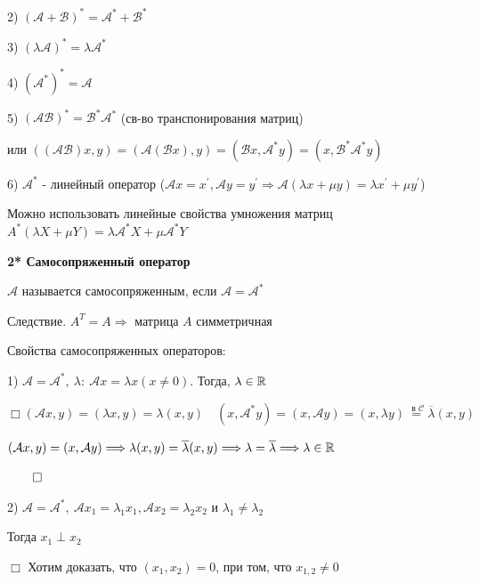 \documentclass[12pt]{article}
\begin{document}
    2) $\displaystyle (\mathcal{A} + \mathcal{B})^* = \mathcal{A}^* + \mathcal{B}^*$

    3) $\displaystyle (\lambda \mathcal{A})^* = \lambda \mathcal{A}^*$

    4) $\displaystyle (\mathcal{A}^*)^* = \mathcal{A}$

    5) $\displaystyle (\mathcal{A}\mathcal{B})^* = \mathcal{B}^* \mathcal{A}^*$ (св-во транспонирования матриц)

    или $\displaystyle ((\mathcal{AB})x, y) = (\mathcal{A}(\mathcal{B}x), y) = (\mathcal{B}x, \mathcal{A}^* y) = (x, \mathcal{B}^* \mathcal{A}^* y)$

    6) $\displaystyle \mathcal{A}^*$ - линейный оператор ($\displaystyle \mathcal{A}x = x^\prime, \mathcal{A}y = y^\prime \Longrightarrow \mathcal{A}(\lambda x + \mu y) = \lambda x^\prime + \mu y^\prime$)

    Можно использовать линейные свойства умножения матриц $\displaystyle A^* (\lambda X + \mu Y) = \lambda \mathcal{A}^* X + \mu \mathcal{A}^* Y$

    \textbf{2* Самосопряженный оператор}

    \Def $\mathcal{A}$ называется самосопряженным, если $\displaystyle \mathcal{A} = \mathcal{A}^*$

    Следствие. $\displaystyle A^T = A \Longrightarrow$ матрица $A$ симметричная

    Свойства самосопряженных операторов:

    1) $\displaystyle \mathcal{A} = \mathcal{A}^*, \ \lambda : \ \mathcal{A}x = \lambda x (x \neq 0)$. Тогда, $\lambda \in \mathbb{R}$

    $\displaystyle \Box (\mathcal{A}x, y) = (\lambda x, y) = \lambda (x, y) \quad (x, \mathcal{A}^* y) = (x, \mathcal{A}y) = (x, \lambda y) \stackrel{\text{ в } \mathcal{C}}{=} \overline{\lambda} (x, y)$

    $(\mathcal{A}x, y) = (x, \mathcal{A}y) \Longrightarrow \lambda (x, y) = \overline{\lambda} (x, y) \Longrightarrow \lambda = \overline{\lambda} \Longrightarrow \lambda \in \mathbb{R}$

    $\qed$

    2) $\displaystyle \mathcal{A} = \mathcal{A}^*, \ \mathcal{A}x_1 = \lambda_1 x_1, \mathcal{A}x_2 = \lambda_2 x_2$ и $\displaystyle \lambda_1 \neq \lambda_2$

    Тогда $\displaystyle x_1 \perp x_2$

    $\Box$ Хотим доказать, что $\displaystyle (x_1, x_2) = 0$, при том, что $\displaystyle x_{1,2} \neq 0$
\end{document}
